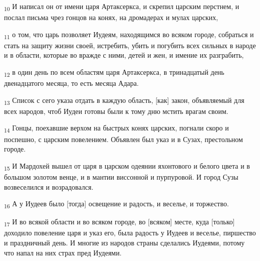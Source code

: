 \begin{tcolorbox}
\textsubscript{10} И написал он от имени царя Артаксеркса, и скрепил царским перстнем, и послал письма чрез гонцов на конях, на дромадерах и мулах царских,
\end{tcolorbox}
\begin{tcolorbox}
\textsubscript{11} о том, что царь позволяет Иудеям, находящимся во всяком городе, собраться и стать на защиту жизни своей, истребить, убить и погубить всех сильных в народе и в области, которые во вражде с ними, детей и жен, и имение их разграбить,
\end{tcolorbox}
\begin{tcolorbox}
\textsubscript{12} в один день по всем областям царя Артаксеркса, в тринадцатый день двенадцатого месяца, то есть месяца Адара.
\end{tcolorbox}
\begin{tcolorbox}
\textsubscript{13} Список с сего указа отдать в каждую область, [как] закон, объявляемый для всех народов, чтоб Иудеи готовы были к тому дню мстить врагам своим.
\end{tcolorbox}
\begin{tcolorbox}
\textsubscript{14} Гонцы, поехавшие верхом на быстрых конях царских, погнали скоро и поспешно, с царским повелением. Объявлен был указ и в Сузах, престольном городе.
\end{tcolorbox}
\begin{tcolorbox}
\textsubscript{15} И Мардохей вышел от царя в царском одеянии яхонтового и белого цвета и в большом золотом венце, и в мантии виссонной и пурпуровой. И город Сузы возвеселился и возрадовался.
\end{tcolorbox}
\begin{tcolorbox}
\textsubscript{16} А у Иудеев было [тогда] освещение и радость, и веселье, и торжество.
\end{tcolorbox}
\begin{tcolorbox}
\textsubscript{17} И во всякой области и во всяком городе, во [всяком] месте, куда [только] доходило повеление царя и указ его, была радость у Иудеев и веселье, пиршество и праздничный день. И многие из народов страны сделались Иудеями, потому что напал на них страх пред Иудеями.
\end{tcolorbox}

